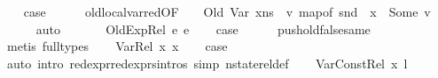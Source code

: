 \begin{isabellebody}
\ \ \isamarkupfalse%
\ {\isacharquery}{\kern0pt}case\isanewline
\ \ \ \ \isamarkupfalse%
\ old{\isacharunderscore}{\kern0pt}local{\isacharunderscore}{\kern0pt}var{\isacharunderscore}{\kern0pt}red{\isacharbrackleft}{\kern0pt}OF\ {\isacartoucheopen}\ {\isasymLambda}{\isacharcomma}{\kern0pt}{\isasymGamma}{\isacharcomma}{\kern0pt}{\isasymOmega}\ {\isasymturnstile}\ {\isasymlangle}Old\ {\isacharparenleft}{\kern0pt}Var\ x{\isacharparenright}{\kern0pt}{\isacharcomma}{\kern0pt}ns{}{\isasymrangle}\ {\isasymDown}\ v{\isacartoucheclose}{\isacharbrackright}{\kern0pt}\ {\isacartoucheopen}map{\isacharunderscore}{\kern0pt}of\ {\isacharparenleft}{\kern0pt}snd\ {\isasymLambda}{\isacharparenright}{\kern0pt}\ x\ {\isacharequal}{\kern0pt}\ Some\ v{\isacharprime}{\kern0pt}{\isacartoucheclose}\isanewline
\ \ \ \ \isamarkupfalse%
\ auto\ \ \ \isanewline
{}\isamarkupfalse%
\isanewline
\ \ \isamarkupfalse%
\ {\isacharparenleft}{\kern0pt}OldExp{\isacharunderscore}{\kern0pt}Rel\ e{}\ e{}{\isacharparenright}{\kern0pt}\isanewline
\ \ \isamarkupfalse%
\ {\isacharquery}{\kern0pt}case\isanewline
\ \ \ \ \isamarkupfalse%
\ push{\isacharunderscore}{\kern0pt}old{\isacharunderscore}{\kern0pt}false{\isacharunderscore}{\kern0pt}same\ \isamarkupfalse%
\ {\isacharparenleft}{\kern0pt}metis\ {\isacharparenleft}{\kern0pt}full{\isacharunderscore}{\kern0pt}types{\isacharparenright}{\kern0pt}{\isacharparenright}{\kern0pt}\isanewline
{}\isamarkupfalse%
\isanewline
\ \ \isamarkupfalse%
\ {\isacharparenleft}{\kern0pt}Var{\isacharunderscore}{\kern0pt}Rel\ x{}\ x{}{\isacharparenright}{\kern0pt}\isanewline
\ \ \isamarkupfalse%
\ {\isacharquery}{\kern0pt}case\ \ \isamarkupfalse%
\ {\isacharparenleft}{\kern0pt}auto\ intro{\isacharcolon}{\kern0pt}\ red{\isacharunderscore}{\kern0pt}expr{\isacharunderscore}{\kern0pt}red{\isacharunderscore}{\kern0pt}exprs{\isachardot}{\kern0pt}intros\ simp{\isacharcolon}{\kern0pt}\ nstate{\isacharunderscore}{\kern0pt}rel{\isacharunderscore}{\kern0pt}def{\isacharparenright}{\kern0pt}\isanewline
{}\isamarkupfalse%
\isanewline
\ \ \isamarkupfalse%
\ {\isacharparenleft}{\kern0pt}Var{\isacharunderscore}{\kern0pt}Const{\isacharunderscore}{\kern0pt}Rel\ x{}\ l{\isacharparenright}{\kern0pt}\isanewline
\ \ \isamarkupfalse%

\end{isabellebody}
